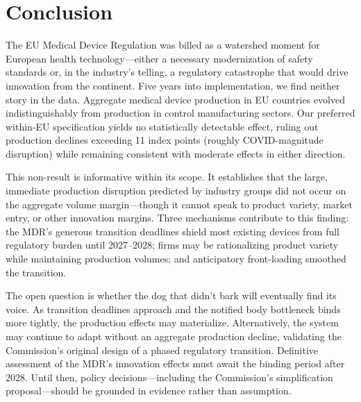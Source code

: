 \documentclass[12pt]{article}
\begin{document}

\section{Conclusion}
\label{sec:conclusion}

The EU Medical Device Regulation was billed as a watershed moment for European health technology---either a necessary modernization of safety standards or, in the industry's telling, a regulatory catastrophe that would drive innovation from the continent. Five years into implementation, we find neither story in the data. Aggregate medical device production in EU countries evolved indistinguishably from production in control manufacturing sectors. Our preferred within-EU specification yields no statistically detectable effect, ruling out production declines exceeding 11 index points (roughly COVID-magnitude disruption) while remaining consistent with moderate effects in either direction.

This non-result is informative within its scope. It establishes that the large, immediate production disruption predicted by industry groups did not occur on the aggregate volume margin---though it cannot speak to product variety, market entry, or other innovation margins. Three mechanisms contribute to this finding: the MDR's generous transition deadlines shield most existing devices from full regulatory burden until 2027--2028; firms may be rationalizing product variety while maintaining production volumes; and anticipatory front-loading smoothed the transition.

The open question is whether the dog that didn't bark will eventually find its voice. As transition deadlines approach and the notified body bottleneck binds more tightly, the production effects may materialize. Alternatively, the system may continue to adapt without an aggregate production decline, validating the Commission's original design of a phased regulatory transition. Definitive assessment of the MDR's innovation effects must await the binding period after 2028. Until then, policy decisions---including the Commission's simplification proposal---should be grounded in evidence rather than assumption.


\end{document}
